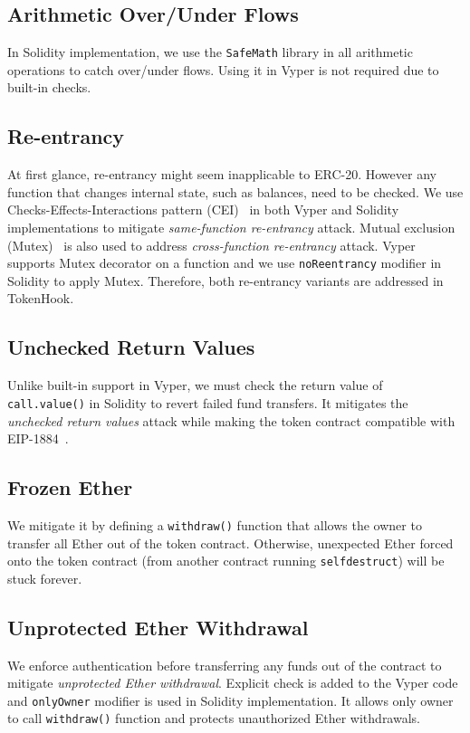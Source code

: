 \subsection*{Arithmetic Over/Under Flows} In Solidity implementation, we use the \texttt{SafeMath} library in all arithmetic operations to catch over/under flows. Using it in Vyper is not required due to built-in checks.

\subsection*{Re-entrancy} At first glance, re-entrancy might seem inapplicable to ERC-20. However any function that changes internal state, such as balances, need to be checked. We use Checks-Effects-Interactions pattern (CEI)~\cite{CEI} in both Vyper and Solidity implementations to mitigate \textit{same-function re-entrancy} attack. Mutual exclusion (Mutex)~\cite{WiKiMutex} is also used to address \textit{cross-function re-entrancy} attack. Vyper supports Mutex decorator on a function and we use \texttt{noReentrancy} modifier in Solidity to apply Mutex. Therefore, both re-entrancy variants are addressed in TokenHook. 

\subsection*{Unchecked Return Values} Unlike built-in support in Vyper, we must check the return value of \texttt{call.value()} in Solidity to revert failed fund transfers. It mitigates the \textit{unchecked return values} attack while making the token contract compatible with EIP-1884~\cite{EIP1884}. 

\subsection*{Frozen Ether} We mitigate it by defining a \texttt{withdraw()} function that allows the owner to transfer all Ether out of the token contract. Otherwise, unexpected Ether forced onto the token contract (\eg from another contract running \texttt{selfdestruct}) will be stuck forever. 

\subsection*{Unprotected Ether Withdrawal} We enforce authentication before transferring any funds out of the contract to mitigate \textit{unprotected Ether withdrawal}. Explicit check is added to the Vyper code and \texttt{onlyOwner} modifier is used in Solidity implementation. It allows only owner to call \texttt{withdraw()} function and protects unauthorized Ether withdrawals. 

